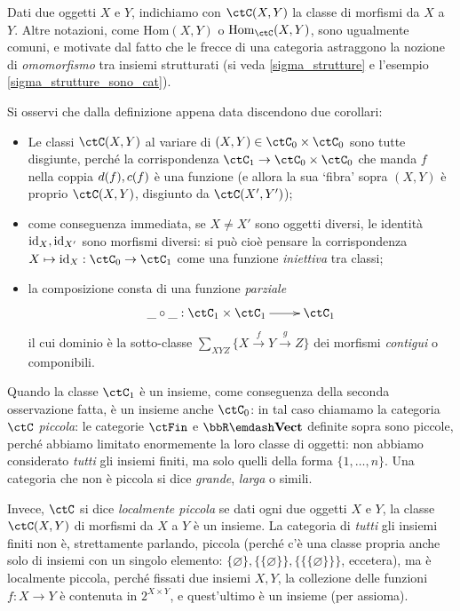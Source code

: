 \begin{notation}
	Dati due oggetti \(X\) e \(Y\), indichiamo con \(\Hom{\ctC}(X,Y)\) la classe di morfismi da \(X\) a \(Y\). Altre notazioni, come \(\mathrm{Hom}(X,Y)\) o \(\mathrm{Hom}_\ctC(X,Y)\), sono ugualmente comuni, e motivate dal fatto che le frecce di una categoria astraggono la nozione di \emph{omomorfismo} tra insiemi strutturati (si veda \ref{sigma_strutture} e l'esempio \ref{sigma_strutture_sono_cat}).
\end{notation}
\begin{remark}
	Si osservi che dalla definizione appena data discendono due corollari:
	\begin{itemize}
		\item Le classi \(\Hom{\ctC}(X,Y)\) al variare di \((X,Y)\in\ctC_0\times\ctC_0\) sono tutte disgiunte, perché la corrispondenza \(\ctC_1 \to \ctC_0\times\ctC_0\) che manda \(f\) nella coppia \(d(f),c(f)\) è una funzione (e allora la sua `fibra' sopra \((X,Y)\) è proprio \(\Hom{\ctC}(X,Y)\), disgiunto da \(\Hom{\ctC}(X',Y')\));
		\item come conseguenza immediata, se \(X\ne X'\) sono oggetti diversi, le identità \(\mathrm{id}_X,\mathrm{id}_{X'}\) sono morfismi diversi: si può cioè pensare la corrispondenza \(X\mapsto \id_X : \ctC_0\to\ctC_1\) come una funzione \emph{iniettiva} tra classi;
		\item la composizione consta di una funzione \emph{parziale}
			\[\xymatrix{\_\circ\_ : \ctC_1 \times \ctC_1 \ar[r] & \ctC_1}\]
			il cui dominio è la sotto-classe $\sum_{XYZ} \{ X \xrightarrow f Y \xrightarrow g Z \}$ dei morfismi \emph{contigui} o componibili.
	\end{itemize}
\end{remark}
\begin{definition}
	Quando la classe \(\ctC_1\) è un insieme, come conseguenza della seconda osservazione fatta, è un insieme anche \(\ctC_0\): in tal caso chiamamo la categoria \(\ctC\) \emph{piccola}: le categorie \(\ctFin\) e \(\bbR\emdash\ctVect\) definite sopra sono piccole, perché abbiamo limitato enormemente la loro classe di oggetti: non abbiamo considerato \emph{tutti} gli insiemi finiti, ma solo quelli della forma \(\{1,\dots,n\}\). Una categoria che non è piccola si dice \emph{grande}, \emph{larga} o simili.

	Invece, \(\ctC\) si dice \emph{localmente piccola} se dati ogni due oggetti \(X\) e \(Y\), la classe \(\Hom{\ctC}(X,Y)\) di morfismi da \(X\) a \(Y\) è un insieme. La categoria di \emph{tutti} gli insiemi finiti non è, strettamente parlando, piccola (perché c'è una classe propria anche solo di insiemi con un singolo elemento: \(\{\varnothing\},\{\{\varnothing\}\}, \{\{\{\varnothing\}\}\}\), eccetera), ma è localmente piccola, perché fissati due insiemi \(X,Y\), la collezione delle funzioni \(f : X\to Y\) è contenuta in \(2^{X\times Y}\), e quest'ultimo è un insieme (per assioma).
\end{definition}
